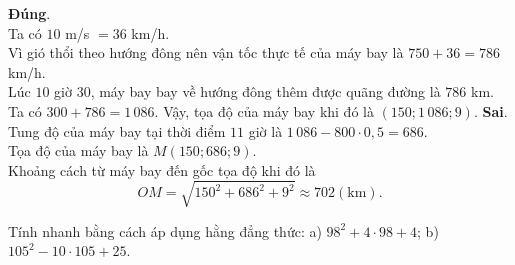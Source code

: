 \begin{ex}
{\begin{itemchoice}
			\itemch \textbf{Đúng}.\\
			Ta có $10$ m/s $=36$ km/h.\\
			Vì gió thổi theo hướng đông nên vận tốc thực tế của máy bay là $750+36=786$ km/h.\\
			Lúc $10$ giờ $30$, máy bay bay về hướng đông thêm được quãng đường là $786$ km.\\
			Ta có $300+786=1\,086$. Vậy, tọa độ của máy bay khi đó là $(150; 1\,086;9)$.
			\itemch \textbf{Sai}.\\
			Tung độ của máy bay tại thời điểm $11$ giờ là
			$1\,086-800\cdot 0{,}5=686$.\\
			Tọa độ của máy bay là $M(150;686;9)$.\\
			Khoảng cách từ máy bay đến gốc tọa độ khi đó là
			$$OM=\sqrt{150^2+686^2+9^2}\approx 702(\mathrm{km}).$$
		\end{itemchoice}
	}
\end{ex}

\begin{bt}%
	Tính nhanh bằng cách áp dụng hằng đẳng thức:
a) $98^2 + 4 \cdot 98 + 4$;
b) $105^2 - 10 \cdot 105 + 25$.
\end{bt}
